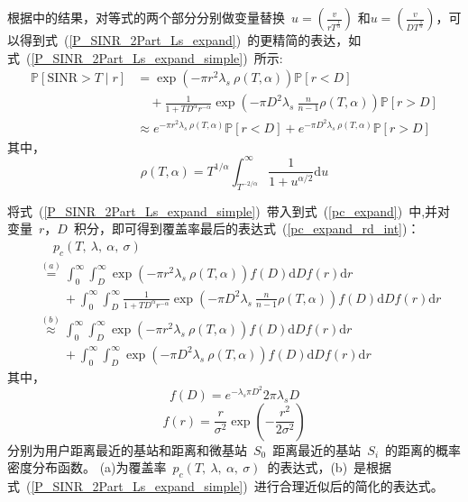 根据\cite{ATractable}中的结果，对等式的两个部分分别做变量替换~$u=\left(\frac{v}{rT^{\frac{1}{\alpha}}}\right)$
和$u=\left(\frac{v}{DT^{\frac{1}{\alpha}}}\right)$，可以得到式~(\ref{P_SINR_2Part_Ls_expand})~的更精简的表达，如式~(\ref{P_SINR_2Part_Ls_expand_simple})~所示:
\begin{equation}\label{P_SINR_2Part_Ls_expand_simple}
  \begin{aligned}
  \mathbb{P}[\mathrm{SINR}>T \mid r] &= \exp\left(-\pi r^2\lambda_s\  \rho(T,\alpha)  \right)\mathbb{P}[r<D] \\
     &\quad + \frac{1}{1+ T D ^\alpha r^{-\alpha}} \exp\left(-\pi D ^2 \lambda_s\ \frac{n}{n-1} \rho(T,\alpha)\right)\mathbb{P}[r>D]\\
    &\approx  e^{-\pi r^2\lambda_s\  \rho(T,\alpha)  }\mathbb{P}[r<D]
    + e^{-\pi D ^2 \lambda_s\ \rho(T,\alpha)}\mathbb{P}[r>D]
\end{aligned}\end{equation}
其中，
\begin{equation}\label{rho}
  \rho(T,\alpha) = T ^{1/\alpha} \int_{T^{-2/\alpha}}^{\infty} \frac{1}{1+u^{\alpha/2}}\mathrm{d}u
\end{equation}

将式~(\ref{P_SINR_2Part_Ls_expand_simple})~带入到式~(\ref{pc_expand})~中,并对变量~$r$，$D$~积分，即可得到覆盖率最后的表达式~(\ref{pc_expand_rd_int})：
\begin{equation}\label{pc_expand_rd_int}
  \begin{aligned}
    &\quad\ p_c(T,~\lambda,~\alpha,~\sigma) \\
    &\overset{(a)}{=}\int_0^\infty  \int_D^{\infty}   \exp\left(-\pi r^2\lambda_s\  \rho(T,\alpha)  \right) f(D)    \mathrm{d} D f(r) \mathrm{d} r\\
    & \qquad + \int_0^\infty  \int_D^{\infty}   \frac{1}{1+ T D ^\alpha r^{-\alpha}} \exp\left(-\pi D ^2 \lambda_s\ \frac{n}{n-1} \rho(T,\alpha)\right) f(D)    \mathrm{d} D f(r) \mathrm{d} r\\
    &\overset{(b)}{\approx} \int_0^\infty  \int_D^{\infty}   \exp\left(-\pi r^2\lambda_s\  \rho(T,\alpha)  \right) f(D)    \mathrm{d} D f(r) \mathrm{d} r\\
    & \qquad + \int_0^\infty  \int_D^{\infty}   \exp\left(-\pi D ^2 \lambda_s\ \rho(T,\alpha)\right) f(D)    \mathrm{d} D f(r) \mathrm{d} r
  \end{aligned}
\end{equation}
其中，
\begin{equation}
  f(D) = e^{-\lambda_s\pi D^2} 2 \pi \lambda_s D
\end{equation}
\begin{equation}
  f(r) = \frac{r}{\sigma^2}\exp(-\frac{r^2}{2\sigma^2})
\end{equation}
分别为用户距离最近的基站和距离和微基站~$S_0$~距离最近的基站~$S_i$~的距离的概率密度分布函数。
(a)为覆盖率~$p_c(T,~\lambda,~\alpha,~\sigma)$~的表达式，(b)~是根据式~(\ref{P_SINR_2Part_Ls_expand_simple})~进行合理近似后的简化的表达式。

